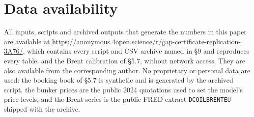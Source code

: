 \documentclass[preprint,12pt,letterpaper]{elsarticle}
\theoremstyle{definition}
\theoremstyle{plain}
\begin{document}
\section*{Data availability}

All inputs, scripts and archived outputs that generate the numbers in this paper are available at \url{https://anonymous.4open.science/r/gap-certificate-replication-3A76/}, which contains every script and CSV archive named in \S 9 and reproduces every table, and the Brent calibration of \S 5.7, without network access. They are also available from the corresponding author. No proprietary or personal data are used: the booking book of \S 5.7 is synthetic and is generated by the archived script, the bunker prices are the public 2024 quotations used to set the model's price levels, and the Brent series is the public FRED extract \texttt{DCOILBRENTEU} shipped with the archive.
\end{document}
